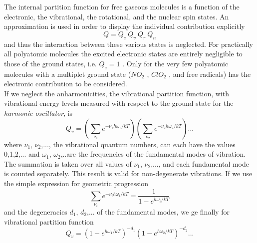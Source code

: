 {The internal partition function for free gaseous molecules is  a
function of the electronic, the vibrational, the rotational, and the
nuclear spin states. An approximation is used in order to display the
individual contribution explicitly
\begin{equation}
 Q=Q_e~Q_v~Q_r~Q_n
\label{}
\end{equation}
and thus the interaction between these various states is neglected.
For practically all polyatomic molecules the excited electronic states
are entirely negligible to those of the ground states, i.e. $Q_e=1$ .
Only for the very few polyatomic molecules with a multiplet ground
state ($NO_2$ , $ClO_2$ , and free radicals) has the
electronic contribution to be considered.\\
If we neglect the anharmonicities, the vibrational partition function,
with vibrational energy levels measured with respect to the ground
state for the {\it harmonic oscillator}, is
\begin{equation}
 Q_v=\left(\sum_{\nu_1}e^{-\nu_1 h\omega_1/kT}\right)\left(\sum_{\nu_2}e^{-\nu_2 h\omega_2/kT}\right)...
\label{}
\end{equation}
where $\nu_1$, $\nu_2$,..., the vibrational quantum numbers, can each
have the values 0,1,2,... and $\omega_1$, $\omega_2$,..are the
frequencies of the fundamental modes of vibration. The summation is
taken over all values of $\nu_1$, $\nu_2$,..., and each fundamental
mode is counted separately. This result is valid for non-degenerate
vibrations. If we use the simple expression for geometric progression
\begin{equation}
 \sum_{\nu_i}e^{-\nu_i h\omega_i/kT}=\frac{1}{1-e^{h\omega_i/kT}}
\label{}
\end{equation}
and the degeneracies $d_1$, $d_2$,... of the fundamental modes, we ge
finally for vibrational partition function
\begin{equation}
Q_v=\left(1-e^{h\omega_1/kT}\right)^{-d_1}\left(1-e^{h\omega_2/kT}\right)^{-d_2}...
\label{}
\end{equation}

}
